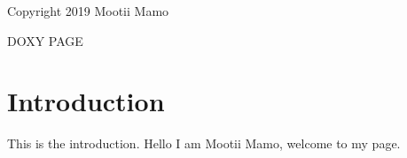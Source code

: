 Copyright 2019 Mootii Mamo

D\+O\+XY P\+A\+GE \hypertarget{index_intro_sec}{}\section{Introduction}\label{index_intro_sec}
This is the introduction. Hello I am Mootii Mamo, welcome to my page. 